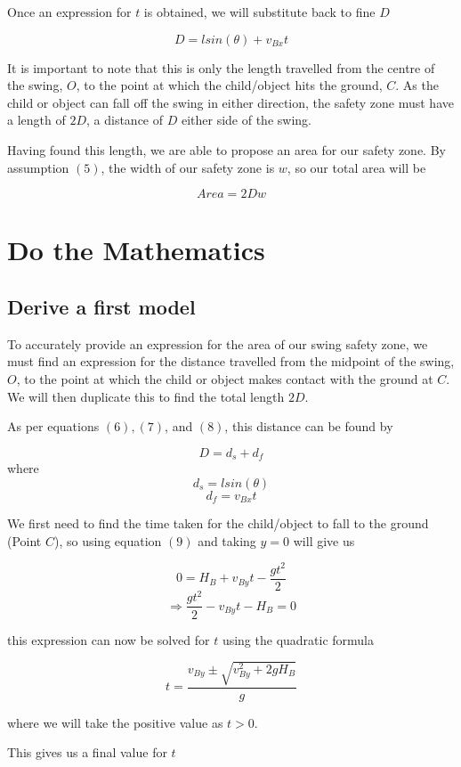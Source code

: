 \documentclass{article}
\begin{document}
Once an expression for $t$ is obtained, we will substitute back to fine $D$

\[D = lsin(\theta) + v_{Bx}t\]

It is important to note that this is only the length travelled from the centre of the swing, $O$, to the point at which the child/object hits the ground, $C$. As the child or object can fall off the swing in either direction, the safety zone must have a length of $2D$, a distance of $D$ either side of the swing.
\par
\noindent Having found this length, we are able to propose an area for our safety zone. By assumption $(5)$, the width of our safety zone is $w$, so our total area will be

\begin{equation}
    Area = 2Dw
\end{equation}

\section*{Do the Mathematics}

\subsection*{Derive a first model}

To accurately provide an expression for the area of our swing safety zone, we must find an expression for the distance travelled from the midpoint of the swing, $O$, to the point at which the child or object makes contact with the ground at $C$. We will then duplicate this to find the total length $2D$.

As per equations $(6), (7)$, and $(8)$, this distance can be found by 

\[D = d_s + d_f\]
where 
\[d_s = lsin(\theta)\]
\[d_f = v_{Bx}t\]

We first need to find the time taken for the child/object to fall to the ground (Point $C$), so using equation $(9)$ and taking $y = 0$ will give us 

\[0 = H_B + v_{By}t - \frac{gt^2}{2}\]
\[\Rightarrow \frac{gt^2}{2} - v_{By}t - H_B = 0\]

this expression can now be solved for $t$ using the quadratic formula

\[ t = \frac{v_{By} \pm \sqrt{v_{By}^2 + 2gH_B}}{g}\]

where we will take the positive value as $t>0$.
\par
\noindent This gives us a final value for $t$ 
\end{document}
